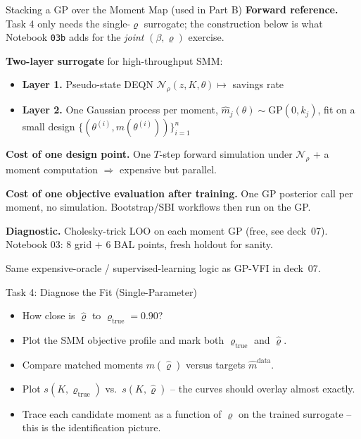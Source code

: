 \documentclass[10pt,aspectratio=169]{beamer}
\begin{document}
\begin{frame}{Stacking a GP over the Moment Map (used in Part B)}
\textbf{Forward reference.} Task 4 only needs the single-$\varrho$ surrogate; the construction below is what Notebook \texttt{03b} adds for the \emph{joint} $(\beta,\varrho)$ exercise.

\medskip
\textbf{Two-layer surrogate} for high-throughput SMM:

\smallskip
\begin{itemize}\itemsep0pt
  \item \textbf{Layer 1.} Pseudo-state DEQN $\mathcal{N}_\rho(z, K, \theta) \mapsto $ savings rate
  \item \textbf{Layer 2.} One Gaussian process per moment, $\widehat m_j(\theta) \sim \mathrm{GP}(0, k_j)$, fit on a small design $\{(\theta^{(i)}, m(\theta^{(i)}))\}_{i=1}^n$
\end{itemize}

\smallskip
\textbf{Cost of one design point.} One $T$-step forward simulation under $\mathcal{N}_\rho$ + a moment computation $\Rightarrow$ expensive but parallel.

\smallskip
\textbf{Cost of one objective evaluation after training.} One GP posterior call per moment, no simulation. Bootstrap/SBI workflows then run on the GP.

\smallskip
\textbf{Diagnostic.} Cholesky-trick LOO on each moment GP (free, see deck~07). Notebook 03: 8 grid + 6 BAL points, fresh holdout for sanity.

\medskip
{\scriptsize Same expensive-oracle / supervised-learning logic as GP-VFI in deck~07.}
\end{frame}

\begin{frame}{Task 4: Diagnose the Fit (Single-Parameter)}
\begin{itemize}
  \item How close is $\hat\varrho$ to $\varrho_{\text{true}} = 0.90$?
  \item Plot the SMM objective profile and mark both $\varrho_{\text{true}}$ and $\hat\varrho$.
  \item Compare matched moments $m(\hat\varrho)$ versus targets $\hat{m}^{\mathrm{data}}$.
  \item Plot $s(K, \varrho_{\text{true}})$ vs.\ $s(K, \hat\varrho)$ -- the curves should overlay almost exactly.
  \item Trace each candidate moment as a function of $\varrho$ on the trained surrogate -- this is the identification picture.
\end{itemize}
\end{frame}
\end{document}
